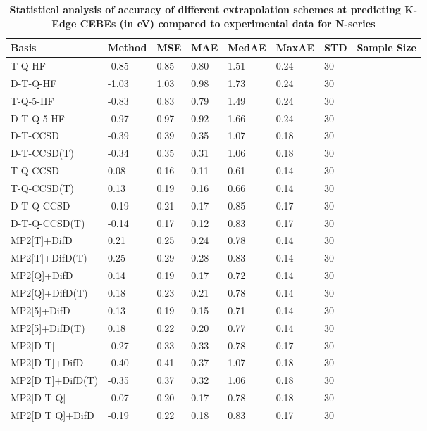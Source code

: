 \begin{table}
  \caption{\textbf{Statistical analysis of accuracy of different extrapolation schemes at predicting K-Edge CEBEs (in eV) compared to experimental data for N-series}}
  \label{tbl:extrap-scheme-summary-n}
  \begin{tabular}{l l l l l l l l }
    \toprule
    \textbf{Basis} & \textbf{Method} & \textbf{MSE} & \textbf{MAE} & \textbf{MedAE} & \textbf{MaxAE} & \textbf{STD} & \textbf{Sample Size} \\ 
    \midrule
    T-Q-HF & -0.85 & 0.85 & 0.80 & 1.51 & 0.24 & 30 \\ 
    D-T-Q-HF & -1.03 & 1.03 & 0.98 & 1.73 & 0.24 & 30 \\ 
    T-Q-5-HF & -0.83 & 0.83 & 0.79 & 1.49 & 0.24 & 30 \\ 
    D-T-Q-5-HF & -0.97 & 0.97 & 0.92 & 1.66 & 0.24 & 30 \\ 
    D-T-CCSD & -0.39 & 0.39 & 0.35 & 1.07 & 0.18 & 30 \\ 
    D-T-CCSD(T) & -0.34 & 0.35 & 0.31 & 1.06 & 0.18 & 30 \\ 
    T-Q-CCSD & 0.08 & 0.16 & 0.11 & 0.61 & 0.14 & 30 \\ 
    T-Q-CCSD(T) & 0.13 & 0.19 & 0.16 & 0.66 & 0.14 & 30 \\ 
    D-T-Q-CCSD & -0.19 & 0.21 & 0.17 & 0.85 & 0.17 & 30 \\ 
    D-T-Q-CCSD(T) & -0.14 & 0.17 & 0.12 & 0.83 & 0.17 & 30 \\ 
    MP2[T]+DifD & 0.21 & 0.25 & 0.24 & 0.78 & 0.14 & 30 \\ 
    MP2[T]+DifD(T) & 0.25 & 0.29 & 0.28 & 0.83 & 0.14 & 30 \\ 
    MP2[Q]+DifD & 0.14 & 0.19 & 0.17 & 0.72 & 0.14 & 30 \\ 
    MP2[Q]+DifD(T) & 0.18 & 0.23 & 0.21 & 0.78 & 0.14 & 30 \\ 
    MP2[5]+DifD & 0.13 & 0.19 & 0.15 & 0.71 & 0.14 & 30 \\ 
    MP2[5]+DifD(T) & 0.18 & 0.22 & 0.20 & 0.77 & 0.14 & 30 \\ 
    MP2[D T] & -0.27 & 0.33 & 0.33 & 0.78 & 0.17 & 30 \\ 
    MP2[D T]+DifD & -0.40 & 0.41 & 0.37 & 1.07 & 0.18 & 30 \\ 
    MP2[D T]+DifD(T) & -0.35 & 0.37 & 0.32 & 1.06 & 0.18 & 30 \\ 
    MP2[D T Q] & -0.07 & 0.20 & 0.17 & 0.78 & 0.18 & 30 \\ 
    MP2[D T Q]+DifD & -0.19 & 0.22 & 0.18 & 0.83 & 0.17 & 30 \\ 

\end{tabular}
\end{table}
